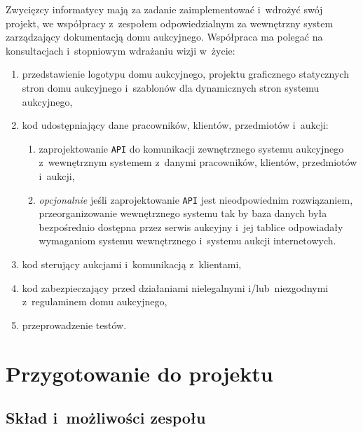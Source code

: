 \documentclass[10pt,a4paper]{article}
\begin{document}
Zwycięzcy informatycy mają za zadanie zaimplementować i~wdrożyć swój projekt,
we współpracy z~zespołem odpowiedzialnym za wewnętrzny system zarządzający
dokumentacją domu aukcyjnego. Współpraca ma polegać na konsultacjach
i~stopniowym wdrażaniu wizji w~życie:
\begin{enumerate}
  \item przedstawienie logotypu domu aukcyjnego, projektu graficznego
    statycznych stron domu aukcyjnego i~szablonów dla dynamicznych stron
    systemu aukcyjnego,
  \item kod udostępniający dane pracowników, klientów, przedmiotów i~aukcji:
  \begin{enumerate}
    \item zaprojektowanie \texttt{API} do komunikacji zewnętrznego systemu
      aukcyjnego z~wewnętrznym systemem z~danymi pracowników, klientów,
      przedmiotów i~aukcji,
    \item \emph{opcjonalnie} jeśli zaprojektowanie \texttt{API} jest
      nieodpowiednim rozwiązaniem, przeorganizowanie wewnętrznego systemu tak
      by baza danych była bezpośrednio dostępna przez serwis aukcyjny i~jej
      tablice odpowiadały wymaganiom systemu wewnętrznego i~systemu aukcji
      internetowych.
  \end{enumerate}
  \item kod sterujący aukcjami i~komunikacją z~klientami,
  \item kod zabezpieczający przed działaniami nielegalnymi i/lub~niezgodnymi
    z~regulaminem domu aukcyjnego,
  \item przeprowadzenie testów.
\end{enumerate}

\section{Przygotowanie do projektu}

\subsection{Skład i~możliwości zespołu}
\end{document}
